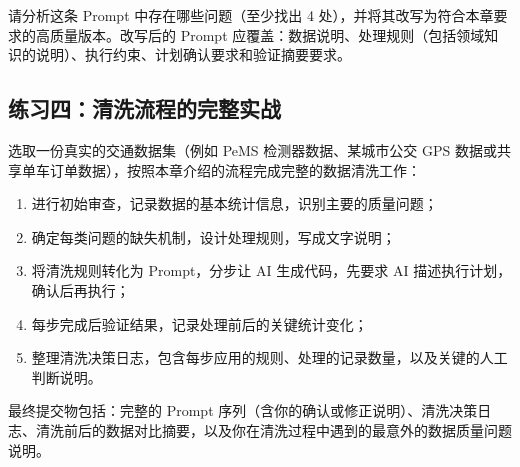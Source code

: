 请分析这条 Prompt 中存在哪些问题（至少找出 4 处），并将其改写为符合本章要求的高质量版本。改写后的 Prompt 应覆盖：数据说明、处理规则（包括领域知识的说明）、执行约束、计划确认要求和验证摘要要求。

\subsection*{练习四：清洗流程的完整实战}

选取一份真实的交通数据集（例如 PeMS 检测器数据、某城市公交 GPS 数据或共享单车订单数据），按照本章介绍的流程完成完整的数据清洗工作：

\begin{enumerate}
  \item 进行初始审查，记录数据的基本统计信息，识别主要的质量问题；
  \item 确定每类问题的缺失机制，设计处理规则，写成文字说明；
  \item 将清洗规则转化为 Prompt，分步让 AI 生成代码，先要求 AI 描述执行计划，确认后再执行；
  \item 每步完成后验证结果，记录处理前后的关键统计变化；
  \item 整理清洗决策日志，包含每步应用的规则、处理的记录数量，以及关键的人工判断说明。
\end{enumerate}

最终提交物包括：完整的 Prompt 序列（含你的确认或修正说明）、清洗决策日志、清洗前后的数据对比摘要，以及你在清洗过程中遇到的最意外的数据质量问题说明。





